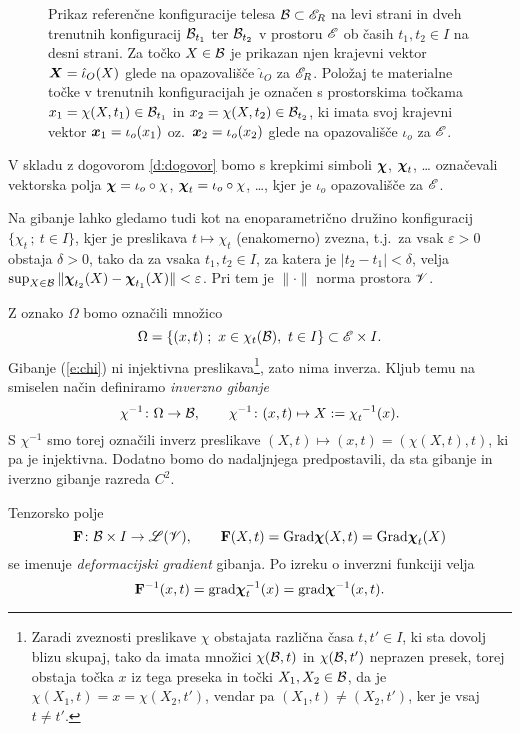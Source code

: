 \begin{figure}[h]
 \begin{center}
	
	\caption{Prikaz referenčne konfiguracije telesa $\mathcal B\subset\mathscr E_R$ na levi strani in dveh trenutnih
	konfiguracij $\mathcal B_{t_1}$ ter $\mathcal B_{t_2}$ v prostoru $\mathscr E$ ob časih $t_1,t_2\in I$ na desni strani.
	Za točko $X\in\mathcal B$ je prikazan njen krajevni vektor $\boldsymbol X=\hat{\iota}_O(X)$ glede na opazovališče
	$\hat{\iota}_O$ za $\mathscr E_R$. Položaj te materialne točke v trenutnih konfiguracijah je označen
	s prostorskima točkama $x_1=\chi(X,t_1)\in\mathcal B_{t_1}$ in $x_2=\chi(X,t_2)\in\mathcal B_{t_2}$, ki imata
	svoj krajevni vektor $\boldsymbol x_1=\iota_o(x_1)$ oz.~$\boldsymbol x_2=\iota_o(x_2)$ glede na opazovališče
	$\iota_o$ za $\mathscr E$.}
 \end{center}
\end{figure}

V skladu z dogovorom \ref{d:dogovor} bomo s krepkimi simboli $\boldsymbol \chi$, $\boldsymbol \chi_t$, \dots
označevali vektorska polja $\boldsymbol \chi=\iota_o\circ\chi$, $\boldsymbol \chi_t=\iota_o\circ\chi$, \dots,
kjer je $\iota_o$ opazovališče za $\mathscr E$.

Na gibanje lahko gledamo tudi kot na enoparametrično družino konfiguracij
$\{ \chi_t\,;\ t\in I \}$, kjer je preslikava $t\mapsto\chi_t$ (enakomerno) zvezna,
t.j.~za vsak $\varepsilon>0$ obstaja $\delta>0$, tako da za vsaka $t_1,t_2\in I$,
za katera je $|t_2-t_1|<\delta$, velja $\sup_{X\in\mathcal B}\|\boldsymbol \chi_{t_2}(X)-\boldsymbol \chi_{t_1}(X)\|<\varepsilon$.
Pri tem je $\|\cdot\|$ norma prostora $\mathscr V$.

Z oznako $\Omega$ bomo označili množico
\[ \Omega=\{(x,t)\;;\ x\in\chi_t(\B),\ t\in I\}\subset\E\times I. \]
Gibanje (\ref{e:chi}) ni injektivna preslikava\footnote{Zaradi zveznosti preslikave $\chi$
obstajata različna časa $t,t'\in I$, ki sta dovolj blizu skupaj, tako da imata množici $\chi(\mathcal B,t)$
in $\chi(\mathcal B,t')$ neprazen presek, torej obstaja točka $x$ iz tega preseka in točki $X_1,X_2\in\mathcal B$,
da je $\chi(X_1,t)=x=\chi(X_2,t')$, vendar pa $(X_1,t)\neq(X_2,t')$, ker je vsaj $t\neq t'$.},
zato nima inverza. Kljub temu na smiselen način definiramo \emph{inverzno gibanje}
\[
	\chi^{-1}\colon\Omega\to \B,\qquad
	\chi^{-1}\colon(x,t)\mapsto X:=\bottop{\chi}{t}{-1}(x).
\]
S $\chi^{-1}$ smo torej označili inverz preslikave $(X,t)\mapsto(x,t)=(\chi(X,t),t)$,
ki pa je injektivna.
Dodatno bomo do nadaljnjega predpostavili, da sta gibanje in iverzno gibanje razreda $C^2$.

Tenzorsko polje
\[
	\mathbf F\colon \mathcal B\times I\to\mathscr L(\mathscr V),\qquad \mathbf F(X,t)=\mathrm{Grad}\boldsymbol \chi(X,t)=\mathrm{Grad}\boldsymbol \chi_t(X)
\]
se imenuje \emph{deformacijski gradient} gibanja. Po izreku o inverzni funkciji velja
\[
	\mathbf F^{-1}(x,t)=\mathrm{grad}\boldsymbol \chi_t^{-1}(x)=\mathrm{grad}\boldsymbol \chi^{-1}(x,t).
\]

